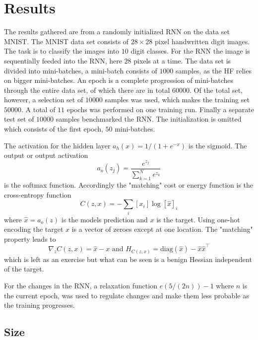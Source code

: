 \chapter{Results}

The results gathered are from a randomly initialized RNN on the data set MNIST. The MNIST data set consists of $28 \times 28$ pixel handwritten digit images. The task is to classify the images into $10$ digit classes. For the RNN the image is sequentially feeded into the RNN, here $28$ pixels at a time. The data set is divided into mini-batches, a mini-batch consists of $1000$ samples, as the HF relies on bigger mini-batches. An epoch is a complete progression of mini-batches through the entire data set, of which there are in total $60 000$. Of the total set, however, a selection set of $10 000$ samples was used, which makes the training set $50000$. A total of $11$ epochs was performed on one training run. Finally a separate test set of $10000$ samples benchmarked the RNN. The initialization is omitted which consists of the first epoch, $50$ mini-batches.

The activation for the hidden layer $a_h(x) = 1/(1 + e^{-x})$ is the sigmoid. The output or output activation \[a_o(z_j) = \frac{e^{z_j}}{\sum_{k=1}^N e^{z_k}}\] is the softmax function. Accordingly the "matching" cost or energy function is the cross-entropy function \[C(z,x) = - \sum_i [x_i] \log [\hat{x}]_i\] where $\hat{x} = a_o(z)$ is the models prediction and $x$ is the target. Using one-hot encoding the target $x$ is a vector of zeroes except at one location. The "matching" property leads to \[\nabla_z C(z,x) = \hat{x} - x \text{ and } H_{C(z,x)} = \text{diag}(\hat{x}) - \hat{x} \hat{x}^\top\] which is left as an exercise but what can be seen is a benign Hessian independent of the target. 

For the changes in the RNN, a relaxation function $e(5/(2n)) - 1$ where $n$ is the current epoch, was used to regulate changes and make them less probable as the training progresses.

\section{Size}

\section{}